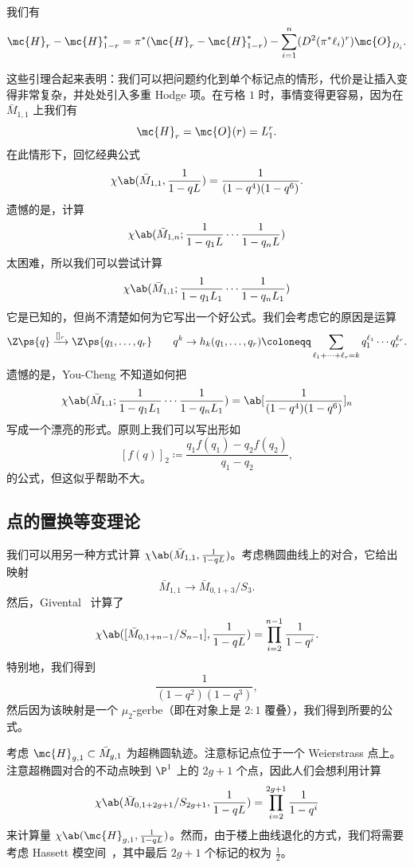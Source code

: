 \begin{lem}
    我们有
    \[ \mc{H}_r - \mc{H}_{1-r}^* = \pi^* (\mc{H}_r - \mc{H}_{1-r}^*) - \sum_{i=1}^n (D^2 (\pi^* \ell_i)^r) \mc{O}_{D_i}. \]
\end{lem}

这些引理合起来表明：我们可以把问题约化到单个标记点的情形，代价是让插入变得非常复杂，并处处引入多重 Hodge 项。在亏格 \(1\) 时，事情变得更容易，因为在 \(\bar{M}_{1,1}\) 上我们有
\[ \mc{H}_r = \mc{O}(r) = L_1^r. \]
在此情形下，回忆经典公式
\[ \chi\ab(\bar{M}_{1,1}, \frac{1}{1-qL}) = \frac{1}{(1-q^4)(1-q^6)}. \]
遗憾的是，计算
\[ \chi\ab(\bar{M}_{1,n}; \frac{1}{1-q_1 L} \cdots \frac{1}{1-q_n L}) \]
太困难，所以我们可以尝试计算
\[ \chi\ab(\bar{M}_{1,1}; \frac{1}{1-q_1 L_1} \cdots \frac{1}{1-q_n L_1})  \]
它是已知的，但尚不清楚如何为它写出一个好公式。我们会考虑它的原因是运算
\[ \Z\ps{q} \xrightarrow{[]_r} \Z\ps{q_1, \ldots, q_r} \qquad q^k \to h_k(q_1, \ldots, q_r) \coloneqq \sum_{\ell_1 + \cdots + \ell_r = k} q_1^{\ell_1} \cdots q_r^{\ell_r}. \]
遗憾的是，You-Cheng 不知道如何把
\[ \chi\ab(\bar{M}_{1,1}; \frac{1}{1-q_1 L_1} \cdots \frac{1}{1-q_n L_1}) = \ab[\frac{1}{(1-q^4)(1-q^6)}]_n \]
写成一个漂亮的形式。原则上我们可以写出形如
\[ [f(q)]_2 \coloneqq \frac{q_1 f(q_1) - q_2 f(q_2)}{q_1 - q_2}, \]
的公式，但这似乎帮助不大。

\subsection{点的置换等变理论}%
\label{sub:Permutation-equivariant theory of a point}

我们可以用另一种方式计算 \(\chi\ab(\bar{M}_{1,1}, \frac{1}{1-q L})\)。考虑椭圆曲线上的对合，它给出映射
\[ \bar{M}_{1,1} \to \bar{M}_{0,1+3}/S_3. \]
然后，Givental~\cite{Givental2017K1} 计算了
\[ \chi\ab([\bar{M}_{0,1+n-1}/S_{n-1}], \frac{1}{1-qL}) = \prod_{i=2}^{n-1} \frac{1}{1-q^i}. \]
特别地，我们得到
\[ \frac{1}{(1-q^2)(1-q^3)}, \]
然后因为该映射是一个 \(\mu_2\)-gerbe（即在对象上是 \(2:1\) 覆叠），我们得到所要的公式。

考虑 \(\mc{H}_{g,1} \subset \bar{M}_{g,1}\) 为超椭圆轨迹。注意标记点位于一个 Weierstrass 点上。注意超椭圆对合的不动点映到 \(\P^1\) 上的 \(2g+1\) 个点，因此人们会想利用计算
\[ \chi\ab(\bar{M}_{0,1+2g+1}/S_{2g+1}, \frac{1}{1-q L}) = \prod_{i=2}^{2g+1} \frac{1}{1-q^i} \]
来计算量
\(\chi\ab(\mc{H}_{g,1}, \frac{1}{1-qL})\)。然而，由于楼上曲线退化的方式，我们将需要考虑 Hassett 模空间~\cite{Hassett2003}，其中最后 \(2g+1\) 个标记的权为 \(\frac{1}{2}\)。







